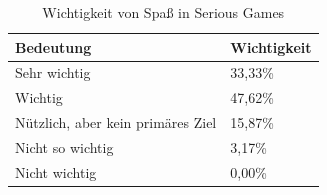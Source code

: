 \begin{table}
    \centering
    \begin{tabular}{|l|l|} 
        \hline
        \rowcolor[rgb]{0.851,0.851,0.851} \textbf{Bedeutung}                & \textbf{Wichtigkeit}  \\ 
        \hline
        Sehr wichtig                      & 33,33\%               \\ 
        \hline
        Wichtig                           & 47,62\%               \\ 
        \hline
        Nützlich, aber kein primäres Ziel & 15,87\%               \\ 
        \hline
        Nicht so wichtig                  & 3,17\%                \\ 
        \hline
        Nicht wichtig                     & 0,00\%                \\
        \hline
    \end{tabular}
    \caption{Wichtigkeit von Spaß in Serious Games \cite{michael:2006:educate}}
	\label{tab:serious_game_survey}
\end{table}

